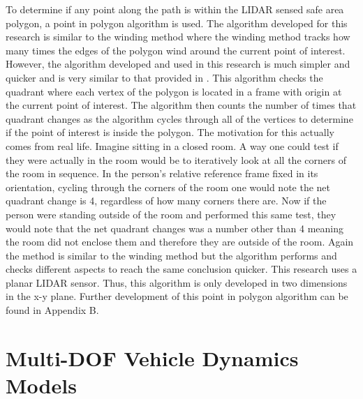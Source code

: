 \documentclass[12pt,onecolumn]{report}
\begin{document}
To determine if any point along the path is within the LIDAR sensed safe area polygon, a point in polygon algorithm is used. The algorithm developed for this research is similar to the winding method where the winding method tracks how many times the edges of the polygon wind around the current point of interest. However, the algorithm developed and used in this research is much simpler and quicker and is very similar to that provided in \cite{pointinpolygon2014}. This algorithm checks the quadrant where each vertex of the polygon is located in a frame with origin at the current point of interest. The algorithm then counts the number of times that quadrant changes as the algorithm cycles through all of the vertices to determine if the point of interest is inside the polygon. The motivation for this actually comes from real life. Imagine sitting in a closed room. A way one could test if they were actually in the room would be to iteratively look at all the corners of the room in sequence. In the person's relative reference frame fixed in its orientation, cycling through the corners of the room one would note the net quadrant change is 4, regardless of how many corners there are. Now if the person were standing outside of the room and performed this same test, they would note that the net quadrant changes was a number other than 4 meaning the room did not enclose them and therefore they are outside of the room. Again the method is similar to the winding method but the algorithm performs and checks different aspects to reach the same conclusion quicker. This research uses a planar LIDAR sensor. Thus, this algorithm is only developed in two dimensions in the x-y plane. Further development of this point in polygon algorithm can be found in Appendix B.


\section{Multi-DOF Vehicle Dynamics Models}\label{s:IntModel}
\end{document}
